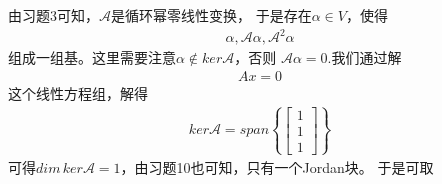 \documentclass{article}
\begin{document}
由习题3可知，$\mathscr{A}$是循环幂零线性变换，
于是存在$\alpha \in V$，使得
\begin{align*}
  \alpha, \mathscr{A} \alpha, \mathscr{A}^2 \alpha
\end{align*}
组成一组基。这里需要注意$\alpha \not \in ker \mathscr{A}$，否则
$\mathscr{A} \alpha = 0$.我们通过解
\begin{align*}
  A x = 0
\end{align*}
这个线性方程组，解得
\begin{align*}
  ker  \mathscr{A} = span\left\{\begin{bmatrix}1 \\ 1 \\ 1\end{bmatrix}\right\}
\end{align*}
可得$dim \, ker \mathscr{A} = 1$，由习题10也可知，只有一个Jordan块。
于是可取
\end{document}
